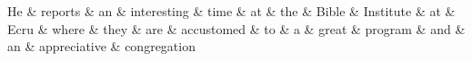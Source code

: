 \documentclass[12pt]{article}
\begin{document}
\begin{dependency}[theme = simple]
\begin{deptext}[column sep=1em]
He \& reports \& an \& interesting \& time \& at \& the \& Bible \& Institute \& at \& Ecru \& where \& they \& are \& accustomed \& to \& a \& great \& program \& and \& an \& appreciative \& congregation \\
\end{deptext}
\end{dependency}
\end{document}
